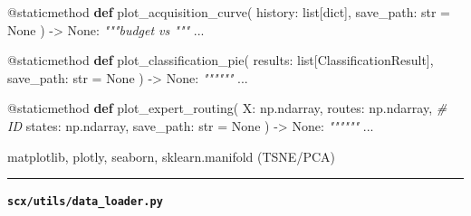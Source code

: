 \documentclass[
  12pt,
]{article}
\newenvironment{Shaded}{}{}
\newcommand{\AttributeTok}[1]{\textcolor[rgb]{0.49,0.56,0.16}{#1}}
\newcommand{\BuiltInTok}[1]{\textcolor[rgb]{0.00,0.50,0.00}{#1}}
\newcommand{\CommentTok}[1]{\textcolor[rgb]{0.38,0.63,0.69}{\textit{#1}}}
\newcommand{\KeywordTok}[1]{\textcolor[rgb]{0.00,0.44,0.13}{\textbf{#1}}}
\newcommand{\NormalTok}[1]{#1}
\newcommand{\OperatorTok}[1]{\textcolor[rgb]{0.40,0.40,0.40}{#1}}
\newcommand{\VariableTok}[1]{\textcolor[rgb]{0.10,0.09,0.49}{#1}}
\begin{document}
\begin{Shaded}
\begin{Highlighting}[]
    \AttributeTok{@staticmethod}
    \KeywordTok{def}\NormalTok{ plot\_acquisition\_curve(}
\NormalTok{        history: }\BuiltInTok{list}\NormalTok{[}\BuiltInTok{dict}\NormalTok{],}
\NormalTok{        save\_path: }\BuiltInTok{str} \OperatorTok{=} \VariableTok{None}
\NormalTok{    ) }\OperatorTok{{-}\textgreater{}} \VariableTok{None}\NormalTok{:}
        \CommentTok{"""budget vs """}
\NormalTok{        ...}

    \AttributeTok{@staticmethod}
    \KeywordTok{def}\NormalTok{ plot\_classification\_pie(}
\NormalTok{        results: }\BuiltInTok{list}\NormalTok{[ClassificationResult],}
\NormalTok{        save\_path: }\BuiltInTok{str} \OperatorTok{=} \VariableTok{None}
\NormalTok{    ) }\OperatorTok{{-}\textgreater{}} \VariableTok{None}\NormalTok{:}
        \CommentTok{""""""}
\NormalTok{        ...}

    \AttributeTok{@staticmethod}
    \KeywordTok{def}\NormalTok{ plot\_expert\_routing(}
\NormalTok{        X: np.ndarray,}
\NormalTok{        routes: np.ndarray,        }\CommentTok{\#  ID}
\NormalTok{        states: np.ndarray,}
\NormalTok{        save\_path: }\BuiltInTok{str} \OperatorTok{=} \VariableTok{None}
\NormalTok{    ) }\OperatorTok{{-}\textgreater{}} \VariableTok{None}\NormalTok{:}
        \CommentTok{""""""}
\NormalTok{        ...}
\end{Highlighting}
\end{Shaded}

matplotlib, plotly, seaborn, sklearn.manifold (TSNE/PCA)

\begin{center}\rule{0.5\linewidth}{0.5pt}\end{center}

\textbf{\texttt{scx/utils/data\_loader.py}}
\end{document}
